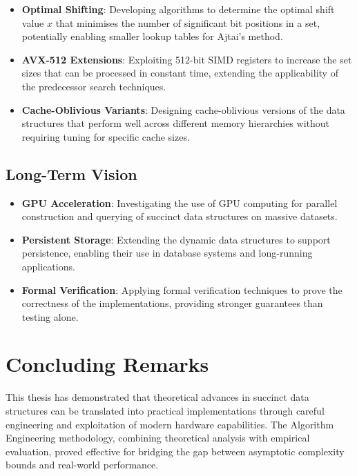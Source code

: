 \begin{itemize}
    \item \textbf{Optimal Shifting}: Developing algorithms to determine the optimal shift value $x$ that minimises the number of significant bit positions in a set, potentially enabling smaller lookup tables for Ajtai's method.

    \item \textbf{AVX-512 Extensions}: Exploiting 512-bit SIMD registers to increase the set sizes that can be processed in constant time, extending the applicability of the predecessor search techniques.

    \item \textbf{Cache-Oblivious Variants}: Designing cache-oblivious versions of the data structures that perform well across different memory hierarchies without requiring tuning for specific cache sizes.
\end{itemize}

\subsection{Long-Term Vision}

\begin{itemize}
    \item \textbf{GPU Acceleration}: Investigating the use of GPU computing for parallel construction and querying of succinct data structures on massive datasets.

    \item \textbf{Persistent Storage}: Extending the dynamic data structures to support persistence, enabling their use in database systems and long-running applications.

    \item \textbf{Formal Verification}: Applying formal verification techniques to prove the correctness of the implementations, providing stronger guarantees than testing alone.
\end{itemize}

\section{Concluding Remarks}

This thesis has demonstrated that theoretical advances in succinct data structures can be translated into practical implementations through careful engineering and exploitation of modern hardware capabilities. The Algorithm Engineering methodology, combining theoretical analysis with empirical evaluation, proved effective for bridging the gap between asymptotic complexity bounds and real-world performance.


